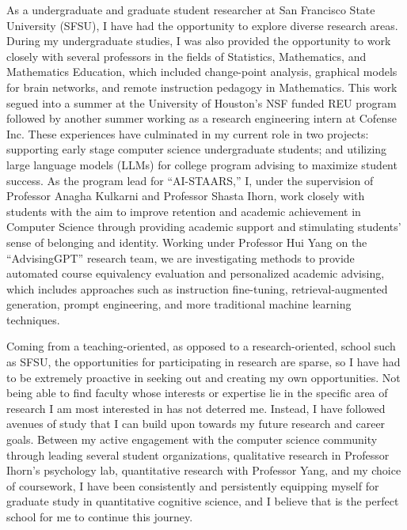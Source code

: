 \documentclass[12pt]{article}
\begin{document}
As a undergraduate and graduate student researcher at San Francisco State University (SFSU), I have had the opportunity to explore diverse
research areas. During my undergraduate studies, I was also provided the opportunity to work closely with several professors in the fields
of Statistics,
Mathematics, and Mathematics Education, which included change-point analysis, graphical models for brain networks, and remote instruction
pedagogy in Mathematics. This work segued into a summer at the University of Houston's NSF funded REU program followed by another summer
working as a research engineering intern at Cofense Inc. These experiences have culminated in my current role in two projects: supporting
early stage computer science undergraduate students; and utilizing large language models (LLMs) for college program advising to maximize
student success. As the program lead for ``AI-STAARS,'' I, under the supervision of Professor Anagha Kulkarni and Professor Shasta Ihorn,
work closely with students with the aim to improve retention and academic achievement in Computer Science through providing academic support
and stimulating students' sense of belonging and identity. Working under Professor Hui Yang on the ``AdvisingGPT'' research team, we are
investigating methods to provide automated course equivalency evaluation and personalized academic advising, which includes approaches such
as instruction fine-tuning, retrieval-augmented generation, prompt engineering, and more traditional machine learning techniques.


Coming from a teaching-oriented, as opposed to a research-oriented, school such as SFSU, the opportunities for participating in research are
sparse, so I have had to be extremely proactive in seeking out and creating my own opportunities. Not being able to find faculty
whose interests or expertise lie in the specific area of research I am most interested in has not deterred me. Instead, I have followed
avenues of study that I can build upon towards my future research and career goals. Between my active engagement with the computer science
community through leading several student organizations, qualitative research in Professor Ihorn's psychology lab, quantitative research
with Professor Yang, and my choice of coursework, I have been consistently and persistently equipping myself for graduate study in
quantitative cognitive science, and I believe that \abbrschool is the perfect school for me to continue this journey.
\end{document}
